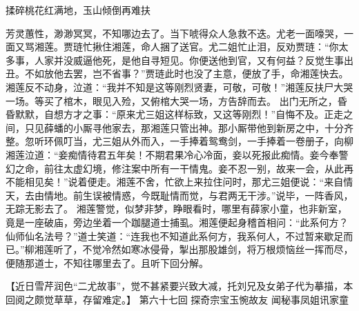 \documentclass[12pt,oneside]{book}
\begin{document}
揉碎桃花红满地，玉山倾倒再难扶

芳灵蕙性，渺渺冥冥，不知哪边去了。当下唬得众人急救不迭。尤老一面嚎哭，一面又骂湘莲。贾琏忙揪住湘莲，命人捆了送官。尤二姐忙止泪，反劝贾琏：“你太多事，人家并没威逼他死，是他自寻短见。你便送他到官，又有何益？反觉生事出丑。不如放他去罢，岂不省事？”贾琏此时也没了主意，便放了手，命湘莲快去。湘莲反不动身，泣道：“我并不知是这等刚烈贤妻，可敬，可敬！”湘莲反扶尸大哭一场。等买了棺木，眼见入殓，又俯棺大哭一场，方告辞而去。
出门无所之，昏昏默默，自想方才之事：“原来尤三姐这样标致，又这等刚烈！”自悔不及。正走之间，只见薛蟠的小厮寻他家去，那湘莲只管出神。那小厮带他到新房之中，十分齐整。忽听环佩叮当，尤三姐从外而入，一手捧着鸳鸯剑，一手捧着一卷册子，向柳湘莲泣道：“妾痴情待君五年矣！不期君果冷心冷面，妾以死报此痴情。妾今奉警幻之命，前往太虚幻境，修注案中所有一干情鬼。妾不忍一别，故来一会，从此再不能相见矣！”说着便走。湘莲不舍，忙欲上来拉住问时，那尤三姐便说：“来自情天，去由情地。前生误被情惑，今既耻情而觉，与君两无干涉。”说毕，一阵香风，无踪无影去了。
湘莲警觉，似梦非梦，睁眼看时，哪里有薛家小童，也非新室，竟是一座破庙，旁边坐着一个跏腿道士捕虱。湘莲便起身稽首相问：“此系何方？仙师仙名法号？”道士笑道：“连我也不知道此系何方，我系何人，不过暂来歇足而已。”柳湘莲听了，不觉冷然如寒冰侵骨，掣出那股雄剑，将万根烦恼丝一挥而尽，便随那道士，不知往哪里去了。且听下回分解。




















 
【近日雪芹润色“二尤故事”，觉不甚紧要兴致大减，托刘兄及女弟子代为摹描，本回阅之颇觉草草，存留难定。】
第六十七回 探奇宗宝玉惋故友 闻秘事凤姐讯家童
\end{document}
